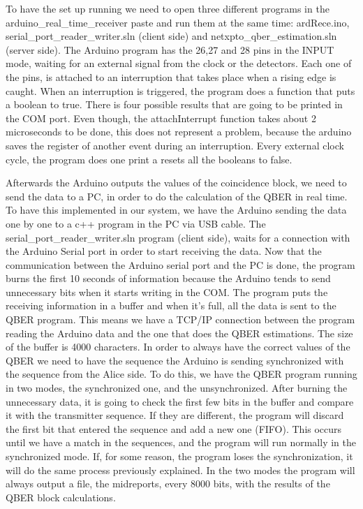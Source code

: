 \begin{refsection}
	To have the set up running we need to open three different programs in the arduino\_real\_time\_receiver paste and run them at the same time: ardRece.ino, serial\_port\_reader\_writer.sln (client side) and netxpto\_qber\_estimation.sln (server side).
	The Arduino program has the 26,27 and 28 pins in the INPUT mode, waiting for an external signal from the clock or the detectors. Each one of the pins, is attached to an interruption that takes place when a rising edge is caught. When an interruption is triggered, the program does a function that puts a boolean to true. There is four possible results that are going to be printed in the COM port.
	Even though, the attachInterrupt function takes about 2 microseconds to be done, this does not represent a problem, because the arduino saves the register of another event during an interruption.
	Every external clock cycle, the program does one print a resets all the booleans to false.
		
	Afterwards the Arduino outputs the values of the coincidence block, we need to send the data to a PC, in order to do the calculation of the QBER in real time. To have this implemented in our system, we have the Arduino sending the data one by one to a c++ program in the PC via USB cable. The serial\_port\_reader\_writer.sln program (client side), waits for a connection with the Arduino Serial port in order to start receiving the data. Now that the communication between the Arduino serial port and the PC is done, the program burns the first 10 seconds of information because the Arduino tends to send unnecessary bits when it starts writing in the COM. The program puts the receiving information in a buffer and when it's full, all the data is sent to the QBER program. This means we have a TCP/IP connection between the program reading the Arduino data and the one that does the QBER estimations. The size of the buffer is 4000 characters. In order to always have the correct values of the QBER we need to have the sequence the Arduino is sending synchronized with the sequence from the Alice side. To do this, we have the QBER program running in two modes, the synchronized one, and the unsynchronized. After burning the unnecessary data, it is going to check the first few bits in the buffer and compare it with the transmitter sequence. If they are different, the program will discard the first bit that entered the sequence and add a new one (FIFO). This occurs until we have a match in the sequences, and the program will run normally in the synchronized mode. If, for some reason, the program loses the synchronization, it will do the same process previously explained. In the two modes the program will always output a file, the midreports, every 8000 bits, with the results of the QBER block calculations. 
		

\end{refsection}
